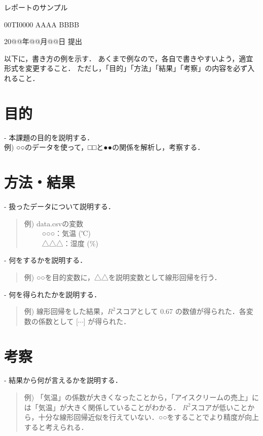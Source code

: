 \documentclass[10pt,a4paper,fleqn,dvipdfmx]{jsarticle}
\begin{document}
\begin{center}

{\Large レポートのサンプル}

\vspace{2mm}
00TI0000 AAAA BBBB

\vspace{2mm}
20@@年@@月@@日 提出
\end{center}

以下に，書き方の例を示す．
あくまで例なので，各自で書きやすいよう，適宜形式を変更すること．
ただし，「目的」「方法」「結果」「考察」の内容を必ず入れること．

\section{目的}

- 本課題の目的を説明する．\\
 \qquad 例) ○○のデータを使って，□□と●●の関係を解析し，考察する．

\section{方法・結果}

- 扱ったデータについて説明する．
\begin{quote}
例) data.csvの変数\\
\ \ \ \ \ ○○○：気温 (℃)\\
\ \ \ \ \ △△△：湿度 ($\%$)
\end{quote}

- 何をするかを説明する．
\begin{quote}
例) ○○を目的変数に，△△を説明変数として線形回帰を行う．
\end{quote}

- 何を得られたかを説明する．
\begin{quote}
例) 線形回帰をした結果，$R^2$スコアとして 0.67 の数値が得られた．各変数の係数として [$\cdots$] が得られた．
\end{quote}

\section{考察}

- 結果から何が言えるかを説明する．
\begin{quote}
例) 「気温」の係数が大きくなったことから，「アイスクリームの売上」には「気温」が大きく関係していることがわかる．
$R^2$スコアが低いことから，十分な線形回帰近似を行えていない．○○をすることでより精度が向上すると考えられる．
\end{quote}
\end{document}
